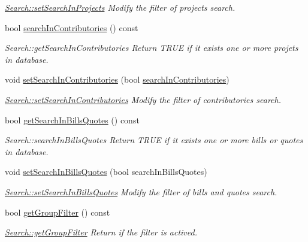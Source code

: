 \begin{DoxyCompactItemize}
\begin{DoxyCompactList}\small\item\em \hyperlink{classModels_1_1Search_ab84375da3e302c7a871b4ced1c8d69c3}{Search\+::set\+Search\+In\+Projects} Modify the filter of projects search. \end{DoxyCompactList}\item 
bool \hyperlink{classModels_1_1Search_ab799572f484cc01a515b36ea3723ee06}{search\+In\+Contributories} () const 
\begin{DoxyCompactList}\small\item\em Search\+::get\+Search\+In\+Contributories Return T\+R\+U\+E if it exists one or more projets in database. \end{DoxyCompactList}\item 
void \hyperlink{classModels_1_1Search_af6305e66a5ca5ad5ba29b15397821e58}{set\+Search\+In\+Contributories} (bool \hyperlink{classModels_1_1Search_ab799572f484cc01a515b36ea3723ee06}{search\+In\+Contributories})
\begin{DoxyCompactList}\small\item\em \hyperlink{classModels_1_1Search_af6305e66a5ca5ad5ba29b15397821e58}{Search\+::set\+Search\+In\+Contributories} Modify the filter of contributories search. \end{DoxyCompactList}\item 
bool \hyperlink{classModels_1_1Search_adf4525d5961793999c191e010a58bb56}{get\+Search\+In\+Bills\+Quotes} () const 
\begin{DoxyCompactList}\small\item\em Search\+::search\+In\+Bills\+Quotes Return T\+R\+U\+E if it exists one or more bills or quotes in database. \end{DoxyCompactList}\item 
void \hyperlink{classModels_1_1Search_a64f82cec524c9bb737e2758445288b43}{set\+Search\+In\+Bills\+Quotes} (bool search\+In\+Bills\+Quotes)
\begin{DoxyCompactList}\small\item\em \hyperlink{classModels_1_1Search_a64f82cec524c9bb737e2758445288b43}{Search\+::set\+Search\+In\+Bills\+Quotes} Modify the filter of bills and quotes search. \end{DoxyCompactList}\item 
bool \hyperlink{classModels_1_1Search_a2f5ee925709a654cedef85732e448438}{get\+Group\+Filter} () const 
\begin{DoxyCompactList}\small\item\em \hyperlink{classModels_1_1Search_a2f5ee925709a654cedef85732e448438}{Search\+::get\+Group\+Filter} Return if the filter is actived. \end{DoxyCompactList}\item 

\end{DoxyCompactItemize}
